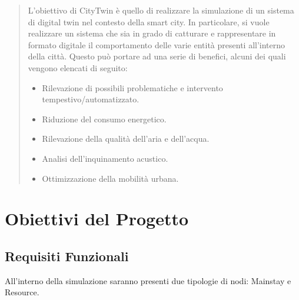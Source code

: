 \documentclass[12pt,a4paper,openright,twoside]{book}
\begin{document}
\renewcommand{\labelenumii}{\arabic{enumi}.\arabic{enumii}}
\renewcommand{\labelenumiii}{\arabic{enumi}.\arabic{enumii}.\arabic{enumiii}}
\renewcommand{\labelenumiv}{\arabic{enumi}.\arabic{enumii}.\arabic{enumiii}.\arabic{enumiv}}
\frontmatter



\begin{abstract}
    L'obiettivo di CityTwin è quello di realizzare la simulazione di un sistema di digital twin nel contesto della smart city. In particolare, si vuole realizzare un sistema che sia in grado di catturare e rappresentare in formato digitale il comportamento delle varie entità presenti all'interno della città. Questo può portare ad una serie di benefici, alcuni dei quali vengono elencati di seguito:
    \begin{itemize}
        \item Rilevazione di possibili problematiche e intervento tempestivo/automatizzato.
        \item Riduzione del consumo energetico.
        \item Rilevazione della qualità dell'aria e dell'acqua.
        \item Analisi dell'inquinamento acustico.
        \item Ottimizzazione della mobilità urbana.
    \end{itemize}
\end{abstract}

\tableofcontents   

\mainmatter

\chapter{Obiettivi del Progetto}
\label{chap:goals}

\section{Requisiti Funzionali}

All'interno della simulazione saranno presenti due tipologie di nodi: Mainstay e Resource.
\end{document}
